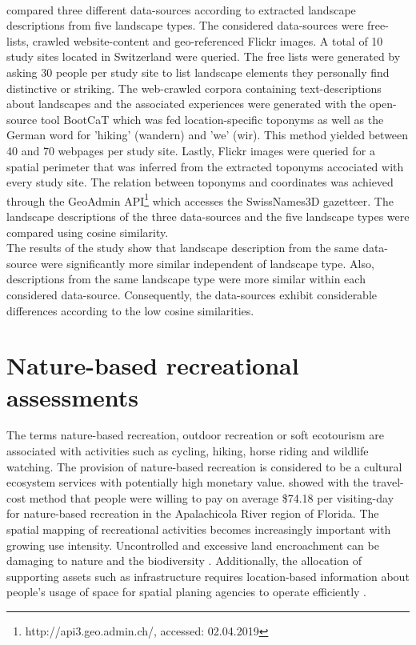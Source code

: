 \paragraph*{\textcite{Wartmann2018}} compared three different data-sources according to extracted landscape descriptions from five landscape types. The considered data-sources were free-lists, crawled website-content and geo-referenced Flickr images. A total of 10 study sites located in Switzerland were queried. The free lists were generated by asking 30 people per study site to list landscape elements they personally find distinctive or striking. The web-crawled corpora containing text-descriptions about landscapes and the associated experiences were generated with the open-source tool BootCaT \parencite{Baroni2004} which was fed location-specific toponyms as well as the German word for 'hiking' (wandern) and 'we' (wir). This method yielded between 40 and 70 webpages per study site. Lastly, Flickr images were queried for a spatial perimeter that was inferred from the extracted toponyms accociated with every study site. The relation between toponyms and coordinates was achieved through the GeoAdmin API\footnote{http://api3.geo.admin.ch/, accessed: 02.04.2019} which accesses the SwissNames3D gazetteer. The landscape descriptions of the three data-sources and the five landscape types were compared using cosine similarity. \\ 
The results of the study show that landscape description from the same data-source were significantly more similar independent of landscape type. Also, descriptions from the same landscape type were more similar within each considered data-source. Consequently, the data-sources exhibit considerable differences according to the low cosine similarities.


\section{Nature-based recreational assessments}
The terms nature-based recreation, outdoor recreation or soft ecotourism \parencite{Deng2002} are associated with activities such as cycling, hiking, horse riding and wildlife watching. The provision of nature-based recreation is considered to be a cultural ecosystem services with potentially high monetary value. \textcite{Shrestha2007} showed with the travel-cost method that people were willing to pay on average \$74.18 per visiting-day for nature-based recreation in the Apalachicola River region of Florida. 
The spatial mapping of recreational activities becomes increasingly important with growing use intensity. Uncontrolled and excessive land encroachment can be damaging to nature and the biodiversity \parencite{Song2018}.
Additionally, the allocation of supporting assets such as infrastructure requires location-based information about people's usage of space for spatial planing agencies to operate efficiently \parencite{Sen2014}.

